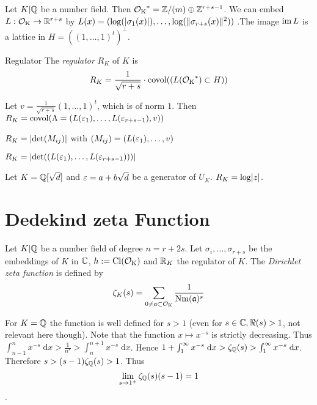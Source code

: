 \documentclass[12pt, a4paper]{article}
\DeclareMathOperator{\Nm}{Nm}
\DeclareMathOperator{\covol}{covol}
\begin{document}
	Let $K \vert \mathbb{Q}$ be a number field. Then $\operatorname{\mathcal{O}_K}^* = \mathbb{Z}/(m) \oplus \mathbb{Z}^{r+s-1}$. 
	We can embed $L: \operatorname{\mathcal{O}_K} \to \mathbb{R}^{r+s}$ by $L(x) = (\log(\lvert \sigma_1(x) \rvert), 
	\dots, \log(\lVert \sigma_{r+s}(x) \rVert^2))$ .The image $\operatorname{im} L$ is a lattice in 
	$H = ((1, \dots, 1)^t)^\perp$.

	\begin{Def}{Regulator}{}
		The \emph{regulator} $R_K$ of $K$ is 
		$$R_K = \frac{1}{\sqrt{r+s}} \cdot \covol((L(\OK^*) \subset H))$$
	\end{Def}

	Let $v = \frac{1}{\sqrt{r+s}} (1, \dots, 1)^t$, which is of norm $1$. 
	Then $R_K = \covol(\Lambda = (L(\eps_1), \dots, L(\eps_{r+s-1}), v))$


	\begin{prop}{}{}
		$R_K = \lvert \det (M_{ij}) \rvert$ with $(M_{ij}) = (L(\varepsilon_1), \dots, v)$
	\end{prop}

	\begin{cor}{}{}
		$R_K = \lvert \det((L(\varepsilon_1), \dots, L(\varepsilon_{r+s-1}))) \rvert$
	\end{cor}

	\begin{ex}
		Let $K = \mathbb{Q}[\sqrt{d}]$ and $\varepsilon = a+b\sqrt{d}$ be a generator of $U_K$.
		$R_K = \log\lvert z \rvert$.
	\end{ex}

	\section{Dedekind zeta Function}

	\begin{Def}{}{}
	Let $K \vert \mathbb{Q}$ be a number field of degree $n = r + 2s$. 
	Let $\sigma_i, \dots, \sigma_{r+s}$ be the embeddings of $K$ in $\mathbb{C}$,
	$h := \operatorname{Cl}(\operatorname{\mathcal{O}_K})$ and $\mathbb{R}_K$ the regulator of $K$. The \emph{Dirichlet zeta
	function} is defined by 
	$$\zeta_K (s) = \sum_{0 \neq \aa \subset \OK} \frac{1}{\Nm(\aa)^s}$$
	\end{Def}
	

	\begin{rem}
		For $K = \mathbb{Q}$ the function is well defined for $s > 1$ (even for 
		$s \in \mathbb{C}, \Re(s) > 1$, not relevant here though). Note that the function
		$x \mapsto x^{-s}$ is strictly decreasing. Thus $\int_{n-1}^{n} 
		x^{-s}\; \mathrm{d}x  > \frac{1}{n^s} > \int_{n}^{n+1} x^{-s}\; \mathrm{d}x  
		$. Hence $1+ \int_{1}^{\infty} x^{-s}\; \mathrm{d}x > \zeta_{\mathbb{Q}}(s) > 
		\int_{1}^{\infty} x^{-s} \; \mathrm{d}x$. Therefore $s > (s-1)\zeta_{\mathbb{Q}}(s) 
		> 1$. Thus 
		$$\lim_{s \to 1^+} \zeta_{\mathbb{Q}}(s)(s-1) = 1$$.
	\end{rem}
\end{document}
